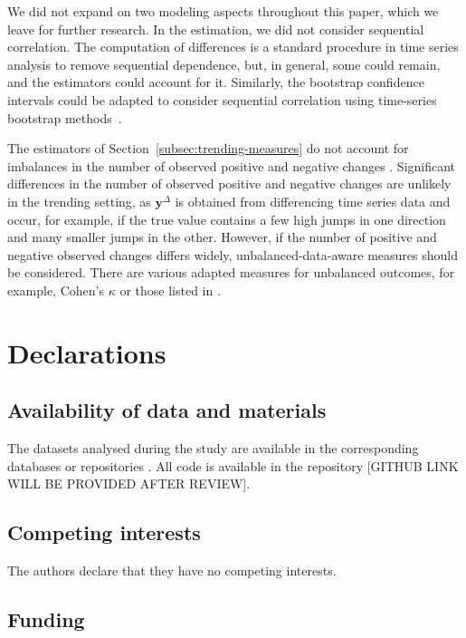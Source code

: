 \documentclass[pdflatex]{sn-jnl}
\theoremstyle{plain}%
\theoremstyle{definition}
\newcommand{\diffy}{\mathbf{y}^{\Delta}}
\begin{document}
We did not expand on two modeling aspects throughout this paper, which we leave for further research.
In the estimation, we did not consider sequential correlation.
The computation of differences is a standard procedure in time series analysis to remove sequential dependence, but, in general, some could remain, and the estimators could account for it.
Similarly, the bootstrap confidence intervals could be adapted to consider sequential correlation using time-series bootstrap methods~\citep{Hardle2003,Kreiss2012}.

The estimators of Section~\ref{subsec:trending-measures} do not account for imbalances in the number of observed positive and negative changes \citep[for a theoretical analysis, see][Chapter 3]{Jolliffe2012}.
Significant differences in the number of observed positive and negative changes are unlikely in the trending setting, as $\diffy$ is obtained from differencing time series data and occur, for example, if the true value contains a few high jumps in one direction and many smaller jumps in the other.
However, if the number of positive and negative observed changes differs widely, unbalanced-data-aware measures should be considered.
There are various adapted measures for unbalanced outcomes, for example, Cohen's $\kappa$ \citep{Cohen1960} or those listed in \citet[Table 3.3]{Jolliffe2012}.


\section*{Declarations}
\subsection*{Availability of data and materials}

The datasets analysed during the study are available in the corresponding databases or repositories \parencite{ChairOfEconometricsAndStatisticsAtKarlsruheInstituteOfTechnology2024,Rostami-Tabar2023, Moody2017}.
All code is available in the repository [GITHUB LINK WILL BE PROVIDED AFTER REVIEW].


\subsection*{Competing interests}
The authors declare that they have no competing interests.

\subsection*{Funding}
\end{document}
